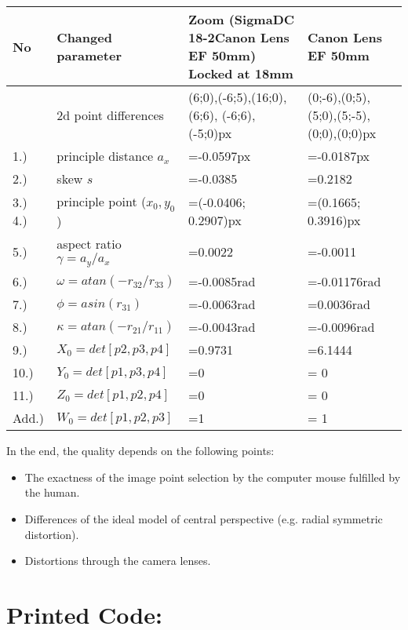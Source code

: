 \documentclass[a4paper,headings=small]{scrartcl}
\numberwithin{equation}{section} %
\numberwithin{figure}{section}   %
\begin{document}
\begin{tabular}{ l l || p{4cm} || p{3.5cm}}
      No & Changed parameter & Zoom (SigmaDC 18-2Canon Lens EF 50mm) Locked at 18mm & Canon Lens EF 50mm \\
      \hline
               & 2d point differences          & (6;0),(-6;5),(16;0),(6;6), (-6;6),(-5;0)px   &  (0;-6),(0;5),(5;0),(5;-5),(0;0),(0;0)px \\
      1.)      & principle distance $a_x$      & =-0.0597px   &  =-0.0187px \\
      2.)      & skew $s$                      & =-0.0385 &  =0.2182   \\
      3.)  4.) & principle point ($x_0, y_0$)  & =(-0.0406; 0.2907)px &  =(0.1665; 0.3916)px\\
      5.)      & aspect ratio $\gamma=a_y/a_x$ & =0.0022 &  =-0.0011 \\
      6.) & $\omega=atan(-r_{32}/r_{33})$ & =-0.0085rad &  =-0.01176rad \\
      7.) & $\phi=asin(r_{31})$ & =-0.0063rad &  =0.0036rad  \\
      8.) & $\kappa=atan(-r_{21}/r_{11})$ & =-0.0043rad & =-0.0096rad \\
      9.) & $X_0=det[p2,p3,p4]$ & =0.9731 &  =6.1444 \\
      10.) & $Y_0=det[p1,p3,p4]$ & =0 & =   0       \\
      11.) & $Z_0=det[p1,p2,p4]$ & =0 & =   0       \\
      Add.) & $W_0=det[p1,p2,p3]$ & =1 &=   1
\end{tabular}

In the end, the quality depends on the following points:
\begin{itemize} 
\item The exactness of the image point selection by the computer mouse fulfilled by the human. 
\item Differences of the ideal model of central perspective (e.g. radial symmetric distortion).
\item Distortions through the camera lenses.
\end{itemize}

\section{Printed Code:}


\end{document}
